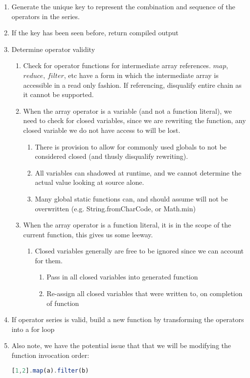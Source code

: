   \begin{enumerate}
    \item Generate the unique key to represent the combination and sequence of the operators in the series.  
    \item If the key has been seen before, return compiled output    
    \item Determine operator validity
    \begin {enumerate}
      \item Check for operator functions for intermediate array references. 
        $map$, $reduce$, $filter$, etc have a form in which the intermediate array 
        is accessible in a read only fashion.  If referencing, disqualify entire chain as
        it cannot be supported.
      \item When the array operator is a variable (and not a function literal), we need to check for closed 
        variables, since we are rewriting the function, any closed variable we do not have access to 
        will be lost.  
      \begin{enumerate}
        \item There is provision to allow for commonly used globals to not be considered closed 
          (and thusly disqualify rewriting).  
        \item All variables can shadowed at runtime, and we cannot determine
          the actual value looking at source alone. 
        \item Many global static functions can, and should assume will not be overwritten (e.g. String.fromCharCode, or Math.min)
      \end{enumerate}
      \item When the array operator is a function literal, it is in the scope of the current function, this gives 
        us some leeway. 
      \begin{enumerate}
        \item Closed variables generally are free to be ignored since we can account for them.
        \begin{enumerate}
          \item Pass in all closed variables into generated function
          \item Re-assign all closed variables that were written to, on completion of function
        \end{enumerate}
      \end{enumerate}
    \end{enumerate}
    \item If operator series is valid, build a new function by transforming the operators into a for loop
    \item Also note, we have the potential issue that that we will be modifying the function invocation order:
        \begin{lstlisting}[language=JavaScript] 
          [1,2].map(a).filter(b) 
        \end{lstlisting}


\end{enumerate}
